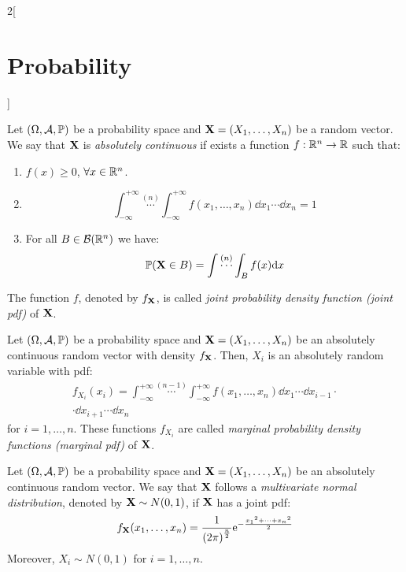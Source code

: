 \documentclass[../../../main.tex]{subfiles}
\begin{document}
\begin{multicols}{2}[\section{Probability}]
\begin{definition}
  \end{definition}
  \begin{definition}
    Let $(\Omega,\mathcal{A},\mathbb{P})$ be a probability space and $\boldsymbol{\mathrm{X}}=(X_1,\ldots,X_n)$ be a random vector. We say that $\boldsymbol{\mathrm{X}}$ is \textit{absolutely continuous} if exists a function $f:\mathbb{R}^n\rightarrow\mathbb{R}$ such that:
    \begin{enumerate}
      \item $f(x)\geq 0$, $\forall x\in\mathbb{R}^n$.
      \item \hfill $$\int_{-\infty}^{+\infty}\overset{(n)}{\cdots}\int_{-\infty}^{+\infty} f(x_1,\ldots,x_n)\dd x_1\cdots\dd x_n=1$$
      \item For all $B\in\mathcal{B}(\mathbb{R}^n)$ we have: $$\mathbb{P}(\boldsymbol{\mathrm{X}}\in B)=\int\overset{(n)}{\cdots}\int_Bf(x)\dd x$$
    \end{enumerate}
    The function $f$, denoted by $f_{\boldsymbol{\mathrm{X}}}$, is called \textit{joint probability density function (joint pdf)} of $\boldsymbol{\mathrm{X}}$.
  \end{definition}
  \begin{prop}
    Let $(\Omega,\mathcal{A},\mathbb{P})$ be a probability space and $\boldsymbol{\mathrm{X}}=(X_1,\ldots,X_n)$ be an absolutely continuous random vector with density $f_{\boldsymbol{\mathrm{X}}}$. Then, $X_i$ is an absolutely random variable with pdf:
    \begin{multline*}
      f_{X_i}(x_i)=\int_{-\infty}^{+\infty}\overset{(n-1)}{\cdots}\int_{-\infty}^{+\infty} f(x_1,\ldots,x_n)\dd x_1\cdots\dd x_{i-1}\cdot\\\cdot\dd x_{i+1}\cdots\dd x_n
    \end{multline*}
    for $i=1,\ldots, n$. These functions $f_{X_i}$ are called \textit{marginal probability density functions (marginal pdf)} of $\boldsymbol{\mathrm{X}}$.
  \end{prop}
  \begin{definition}
    Let $(\Omega,\mathcal{A},\mathbb{P})$ be a probability space and $\boldsymbol{\mathrm{X}}=(X_1,\ldots,X_n)$ be an absolutely continuous random vector. We say that $\boldsymbol{\mathrm{X}}$ follows a \textit{multivariate normal distribution}, denoted by $\boldsymbol{\mathrm{X}}\sim N(0,1)$, if $\boldsymbol{\mathrm{X}}$ has a joint pdf: $$f_{\boldsymbol{\mathrm{X}}}(x_1,\ldots,x_n)=\frac{1}{{(2\pi)}^{\frac{n}{2}}}\mathrm{e}^{-\frac{{x_1}^2+\cdots+{x_n}^2}{2}}$$ Moreover, $X_i\sim N(0,1)$ for $i=1,\ldots,n$.
  \end{definition}

\end{multicols}
\end{document}
